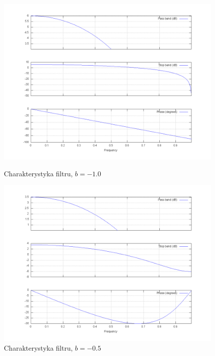 \documentclass[wide,a4paper,titlepage,12pt]{mwart}
\begin{document}
  \begin{figure}[htbp]
    \begin{center}
      \includegraphics[scale=.3]{out/fig3.png}
      \caption{\label{fig3} Charakterystyka filtru, $b=-1.0$}
      \includegraphics[scale=.3]{out/fig4.png}
      \caption{\label{fig4} Charakterystyka filtru, $b=-0.5$}

    \end{center}
  \end{figure}
\end{document}
